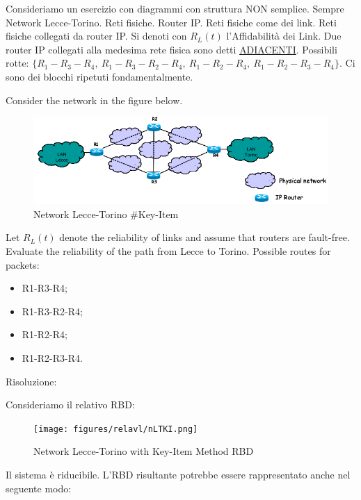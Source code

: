 Consideriamo un esercizio con diagrammi con struttura NON semplice. Sempre Network Lecce-Torino. Reti fisiche. Router IP. Reti fisiche come dei link. Reti fisiche collegati da router IP. Si denoti con $R_L(t)$ l'Affidabilità dei Link. Due router IP collegati alla medesima rete fisica sono detti \underline{ADIACENTI}. Possibili rotte: $\{R_1-R_3-R_4,\ R_1-R_3-R_2-R_4,\ R_1-R_2-R_4,\ R_1-R_2-R_3-R_4\}$. Ci sono dei blocchi ripetuti fondamentalmente.

Consider the network in the figure below. 

\begin{center}
\begin{figure}[H]
\centering
\includegraphics[scale=0.8]{figures/ex/nLTKI.png}
\caption{Network Lecce-Torino \#Key-Item}
\end{figure}
\end{center}

Let $R_L(t)$ denote the reliability of links and assume that routers are fault-free. Evaluate the 
reliability of the path from Lecce to Torino. 
Possible routes for packets: 

\begin{itemize}

\item R1-R3-R4;
\item R1-R3-R2-R4;
\item R1-R2-R4;
\item R1-R2-R3-R4.

\end{itemize}

Risoluzione:

Consideriamo il relativo RBD:

\begin{center}
\begin{figure}[H]
\centering
\texttt{[image: figures/relavl/nLTKI.png]}
\caption{Network Lecce-Torino with Key-Item Method RBD}
\end{figure}
\end{center}

Il sistema è riducibile. L'RBD risultante potrebbe essere rappresentato anche nel seguente modo:

